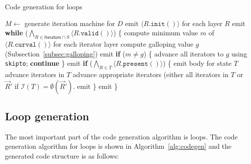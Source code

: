 \documentclass[acmsmall,screen,nonacm]{acmart}\settopmatter{printfolios=true,printccs=false,printacmref=false}
\newcommand*{\interp}{\mathcal{I}}
\begin{document}
\begin{algorithm}[tbp]
    \caption{Code generation for loops}
    \label{alg:codegen}
    \begin{algorithmic}\footnotesize
            \State $M \gets $ generate iteration machine for $D$
            \State emit $\langle R.\texttt{init}() \rangle$ for each layer $R$
                \State emit \textbf{while} ($\bigwedge_{R \in \textsf{iterators} \cap S} \langle R.\texttt{valid}() \rangle$) \{
                \State compute minimum value $m$ of $\langle R.\texttt{curval}() \rangle$ for each iterator layer
                \State compute galloping value $g$ (Subsection~\ref{subsec:galloping})
                    \State emit \textbf{if} ($m \ne g$) \{ advance all iterators to $g$ using \texttt{skipto}; \textbf{continue} \}
                \EndIf
                    \State emit \textbf{if} ($\bigwedge_{R \in T} \langle R.\texttt{present}() \rangle$) \{
                    \If{$\interp(T) = \top$}
                        \State emit body for state $T$
                        \State advance iterators in $T$
                    \Else \Comment{$\interp(T) = \bot, \emptyset$}
                        \State advance appropriate iterators (either all iterators in $T$ or $\vec{R}'$ if $\interp(T) = \emptyset(\vec{R}')$.
                    \EndIf
                    \State emit \}
                \EndFor
                \State emit \}
            \EndFor
        \EndProcedure
    \end{algorithmic}
\end{algorithm}

\subsection{Loop generation}

The most important part of the code generation algorithm is loops. The code generation algorithm for loops is shown in Algorithm~\ref{alg:codegen} and the generated code structure is as follows:
\end{document}
